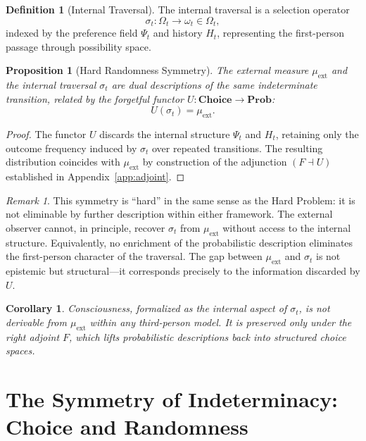 \documentclass[11pt,a4paper]{article}
\newtheorem{proposition}[theorem]{Proposition}
\newtheorem{corollary}[theorem]{Corollary}
\theoremstyle{definition}
\newtheorem{definition}[theorem]{Definition}
\theoremstyle{remark}
\newtheorem{remark}[theorem]{Remark}
\begin{document}
\begin{definition}[Internal Traversal]
The internal traversal is a selection operator
\[
\sigma_t : \Omega_t \to \omega_t \in \Omega_t,
\]
indexed by the preference field $\Psi_t$ and history $H_t$, representing the first-person passage through possibility space.
\end{definition}

\begin{proposition}[Hard Randomness Symmetry]
The external measure $\mu_{\mathrm{ext}}$ and the internal traversal $\sigma_t$ are dual descriptions of the same indeterminate transition, related by the forgetful functor $U : \mathbf{Choice} \to \mathbf{Prob}$:
\[
U(\sigma_t) = \mu_{\mathrm{ext}}.
\]
\end{proposition}

\begin{proof}
The functor $U$ discards the internal structure $\Psi_t$ and $H_t$, retaining only the outcome frequency induced by $\sigma_t$ over repeated transitions. The resulting distribution coincides with $\mu_{\mathrm{ext}}$ by construction of the adjunction $(F \dashv U)$ established in Appendix~\ref{app:adjoint}.
\end{proof}

\begin{remark}
This symmetry is ``hard'' in the same sense as the Hard Problem: it is not eliminable by further description within either framework. The external observer cannot, in principle, recover $\sigma_t$ from $\mu_{\mathrm{ext}}$ without access to the internal structure. Equivalently, no enrichment of the probabilistic description eliminates the first-person character of the traversal. The gap between $\mu_{\mathrm{ext}}$ and $\sigma_t$ is not epistemic but structural---it corresponds precisely to the information discarded by $U$.
\end{remark}

\begin{corollary}
Consciousness, formalized as the internal aspect of $\sigma_t$, is not derivable from $\mu_{\mathrm{ext}}$ within any third-person model. It is preserved only under the right adjoint $F$, which lifts probabilistic descriptions back into structured choice spaces.
\end{corollary}



\section{The Symmetry of Indeterminacy: Choice and Randomness}
\end{document}
